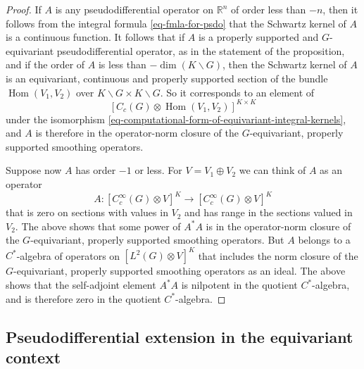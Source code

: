 \documentclass[leqno,11pt]{amsart}
\numberwithin{equation}{subsection}
\theoremstyle{plain}
\theoremstyle{definition}
\theoremstyle{remark}
\newcommand{\R}{\mathbb{R}}
\DeclareMathOperator{\Hom}{Hom}
\begin{document}
\begin{proof} 
If $A$ is any pseudodifferential operator on $\R^n$ of order less than $-n$, then it follows from the integral formula \eqref{eq-fmla-for-psdo} that the Schwartz kernel of $A$ is a continuous function. It  follows that if $A$ is a properly supported and $G$-equivariant pseudodifferential operator, as in the statement of the proposition, and if the order of $A$ is less than $-\dim  (K\backslash G)$, then the Schwartz kernel of $A$ is an equivariant, continuous and properly supported  section of the bundle $\Hom( V_1,V_2)$ over $K\backslash G \times K\backslash G$.  So it corresponds to an element of 
\[
[  C_c  (G) \otimes \Hom (V_1,V_2)]^{K\times K} 
\]
under the isomorphism \eqref{eq-computational-form-of-equivariant-integral-kernels}, and $A$ is therefore in the operator-norm closure of the $G$-equivariant, properly supported smoothing operators.

Suppose now $A$ has order $-1$ or less. For $V= V_1\oplus V_2$ we can think of $A$ as an operator 
 \[
    A \colon [C_c^\infty ( G)\otimes V]^K  \longrightarrow [C_c^\infty ( G)\otimes V]^K 
    \]
that is zero on sections with values in $V_2$ and has range in the sections valued in $V_2$. The above shows that some power of $A^*A$ is in the operator-norm closure of the $G$-equivariant, properly supported smoothing operators.
But $A$ belongs to a $C^*$-algebra of operators on $[L^2( G)\otimes V]^K $ that includes the norm closure of the $G$-equivariant, properly supported smoothing operators as an ideal.  The above shows that the self-adjoint element $A^*A$ is nilpotent in the quotient $C^*$-algebra, and is therefore zero in the quotient $C^*$-algebra.
\end{proof}

\subsection{Pseudodifferential extension in the equivariant context}
\label{subsec-psdo-extension-in-equivariant-context}
\end{document}
